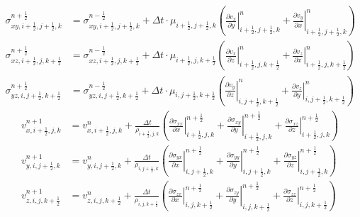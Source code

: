 \documentclass[pdftex,a4paper,parskip,listof=totoc,bibliography=totoc,onehalfspacing,12pt]{scrreprt}
\begin{document}
\begin{align*}
	\sigma_{xy,i+\frac{1}{2},j+\frac{1}{2},k}^{n+\frac{1}{2}} &= \sigma_{xy,i+\frac{1}{2},j+\frac{1}{2},k}^{n-\frac{1}{2}} + \Delta t \cdot \mu_{i+\frac{1}{2},j+\frac{1}{2},k} \left( \left.\frac{\partial v_x}{\partial y}\right\rvert_{i+\frac{1}{2},j+\frac{1}{2},k}^n + \left.\frac{\partial v_y}{\partial x}\right\rvert_{i+\frac{1}{2},j+\frac{1}{2},k}^n \right)\\
	\sigma_{xz,i+\frac{1}{2},j,k+\frac{1}{2}}^{n+\frac{1}{2}} &= \sigma_{xz,i+\frac{1}{2},j,k+\frac{1}{2}}^{n-\frac{1}{2}} + \Delta t \cdot \mu_{i+\frac{1}{2},j,k+\frac{1}{2}} \left( \left.\frac{\partial v_x}{\partial z}\right\rvert_{i+\frac{1}{2},j,k+\frac{1}{2}}^n + \left.\frac{\partial v_z}{\partial x}\right\rvert_{i+\frac{1}{2},j,k+\frac{1}{2}}^n \right)\\
	\sigma_{yz,i,j+\frac{1}{2},k+\frac{1}{2}}^{n+\frac{1}{2}} &= \sigma_{yz,i,j+\frac{1}{2},k+\frac{1}{2}}^{n-\frac{1}{2}} + \Delta t \cdot \mu_{i,j+\frac{1}{2},k+\frac{1}{2}} \left( \left.\frac{\partial v_y}{\partial z}\right\rvert_{i,j+\frac{1}{2},k+\frac{1}{2}}^n + \left.\frac{\partial v_z}{\partial y}\right\rvert_{i,j+\frac{1}{2},k+\frac{1}{2}}^n \right)
\end{align*}
\begin{align*}
	v_{x,i+\frac{1}{2},j,k}^{n+1} &= v_{x,i+\frac{1}{2},j,k}^n + \frac{\Delta t}{\rho_{i+\frac{1}{2},j,k}}  \left( \left.\frac{\partial\sigma_{xx}}{\partial x}\right\rvert_{i+\frac{1}{2},j,k}^{n+\frac{1}{2}} + \left.\frac{\partial\sigma_{xy}}{\partial y}\right\rvert_{i+\frac{1}{2},j,k}^{n+\frac{1}{2}} + \left.\frac{\partial\sigma_{xz}}{\partial z}\right\rvert_{i+\frac{1}{2},j,k}^{n+\frac{1}{2}} \right)\\
	v_{y,i,j+\frac{1}{2},k}^{n+1} &= v_{y,i,j+\frac{1}{2},k}^n + \frac{\Delta t}{\rho_{i,j+\frac{1}{2},k}}  \left( \left.\frac{\partial\sigma_{yx}}{\partial x}\right\rvert_{i,j+\frac{1}{2},k}^{n+\frac{1}{2}} + \left.\frac{\partial\sigma_{yy}}{\partial y}\right\rvert_{i,j+\frac{1}{2},k}^{n+\frac{1}{2}} + \left.\frac{\partial\sigma_{yz}}{\partial z}\right\rvert_{i,j+\frac{1}{2},k}^{n+\frac{1}{2}} \right)\\
	v_{z,i,j,k+\frac{1}{2}}^{n+1} &= v_{z,i,j,k+\frac{1}{2}}^n + \frac{\Delta t}{\rho_{i,j,k+\frac{1}{2}}}  \left( \left.\frac{\partial\sigma_{zx}}{\partial x}\right\rvert_{i,j,k+\frac{1}{2}}^{n+\frac{1}{2}} + \left.\frac{\partial\sigma_{zy}}{\partial y}\right\rvert_{i,j,k+\frac{1}{2}}^{n+\frac{1}{2}} + \left.\frac{\partial\sigma_{zz}}{\partial z}\right\rvert_{i,j,k+\frac{1}{2}}^{n+\frac{1}{2}} \right)
\end{align*}
\end{document}
